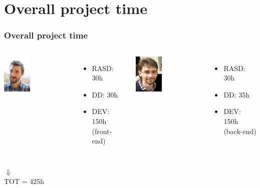\documentclass[professionalfonts]{beamer}
\begin{document}
\section{Overall project time}
\begin{frame}
\frametitle{Overall project time}
\begin{columns}[c]
\includegraphics[width=0.4\textwidth]{images/andrea}
\begin{itemize}
\item RASD: 30h
\item DD: 30h
\item DEV: 150h (front-end)
\end{itemize}

\includegraphics[width=0.4\textwidth]{images/stefano}
\begin{itemize}
\item RASD: 30h
\item DD: 35h
\item DEV: 150h (back-end)
\end{itemize}
\end{columns}
\begin{center}
$\Downarrow$\\
TOT = 425h
\end{center}
\end{frame}
\end{document}
